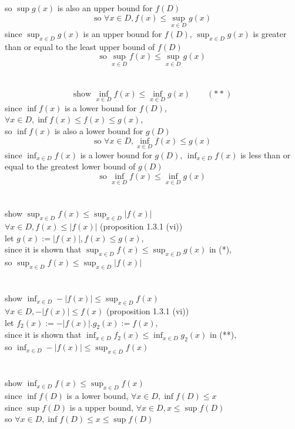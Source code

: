 \documentclass[12pt, border = 4pt, multi]{article} %
\begin{document}
so $\sup g(x)$ is also an upper bound for $f(D)$
\[\text{so }\forall x \in D, f(x) \leq \sup_{x \in D} g(x)\]
since $\sup_{x \in D} g(x)$ is an upper bound for $f(D)$, $\sup_{x \in D} g(x)$ is greater than or equal to the least upper bound of $f(D)$
\[\text{so }\sup_{x \in D} f(x) \leq \sup_{x \in D} g(x)\]
\\
\\
\[\text{show }\inf_{x \in D} f(x) \leq \inf_{x \in D} g(x) \qquad (**)\]
since $\inf f(x)$ is a lower bound for $f(D)$, $\forall x \in D, \inf f(x) \leq f(x) \leq g(x)$,\\
so $\inf f(x)$ is also a lower bound for $g(D)$
\[\text{so }\forall x \in D, \inf_{x \in D} f(x) \leq g(x)\]
since $\inf_{x \in D} f(x)$ is a lower bound for $g(D)$, $\inf_{x \in D} f(x)$ is less than or equal to the greatest lower bound of $g(D)$
\[\text{so }\inf_{x \in D} f(x) \leq \inf_{x \in D} g(x)\]
\\
\\
show $\sup_{x \in D} f(x) \leq \sup_{x \in D} |f(x)|$\\
$\forall x \in D, f(x) \leq |f(x)|$ \qquad (proposition 1.3.1 (vi))\\
let $g(x) := |f(x)|, f(x) \leq g(x)$,\\
since it is shown that $\sup_{x \in D} f(x) \leq \sup_{x \in D} g(x)$ in (*),\\
so $\sup_{x \in D} f(x) \leq \sup_{x \in D} |f(x)|$\\
\\
\\
show $\inf_{x \in D} -|f(x)| \leq \sup_{x \in D} f(x)$\\
$\forall x \in D, -|f(x)| \leq f(x)$ \qquad (proposition 1.3.1 (vi))\\
let $f_2(x) := -|f(x)|. g_2(x) := f(x)$,\\
since it is shown that $\inf_{x \in D} f_2(x) \leq \inf_{x \in D} g_2(x)$ in (**),\\
so $\inf_{x \in D} -|f(x)| \leq \sup_{x \in D} f(x)$\\
\\
\\
show $\inf_{x \in D} f(x) \leq \sup_{x \in D} f(x)$\\
since $\inf f(D)$ is a lower bound, $\forall x \in D, \inf f(D) \leq x$\\
since $\sup f(D)$ is a upper bound, $\forall x \in D, x \leq \sup f(D)$\\
so $\forall x \in D, \inf f(D) \leq x \leq \sup f(D)$\\
\end{document}
